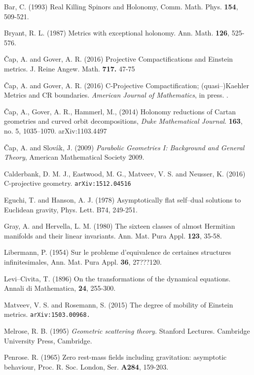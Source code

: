 \begin{thebibliography}{}
 Bar, C. (1993) 
Real Killing Spinors and Holonomy,
Comm. Math. Phys. {\bf 154}, 509-521.

 Bryant, R. L. (1987)
Metrics with exceptional holonomy. Ann. Math. {\bf 126}, 525-576.


 \v Cap, A. and Gover, A. R. (2016)
Projective Compactifications and Einstein metrics.
J. Reine Angew. Math. {\bf 717.}  47-75

 \v Cap, A. and Gover, A. R. (2016)
C-Projective Compactification; (quasi--)Kaehler Metrics and CR boundaries.
{\em  American Journal of Mathematics}, in press. .

 \v Cap, A., Gover, A. R., Hammerl, M., (2014) 
  Holonomy reductions of Cartan geometries and curved orbit
  decompositions, {\em Duke Mathematical Journal}. 
{\bf 163}, no. 5, 1035--1070.
 \quad arXiv:1103.4497

  
\v{C}ap, A. and Slov\'ak, J. (2009)
\emph{Parabolic Geometries I: Background and General Theory},
American Mathematical Society 2009.


 Calderbank,  D. M. J.,  Eastwood, M. G.,  Matveev, V. S. and 
Neusser, K.  (2016) C-projective geometry. {\tt arXiv:1512.04516}






Eguchi, T. and Hanson, A. J. (1978) Asymptotically flat self--dual solutions
to Euclidean gravity, Phys. Lett. B74, 249-251.

Gray, A. and Hervella, L. M. (1980) The sixteen classes of almost Hermitian manifolds and their linear
invariants. Ann. Mat. Pura Appl. {\bf 123}, 35-58.

Libermann, P. (1954) Sur le probleme d'equivalence de certaines structures infinitesimales, Ann.
Mat. Pura Appl. {\bf 36}, 27???120.


 Levi--Civita, T. (1896) On the transformations of the 
dynamical equations. Annali di Mathematica, {\bf 24}, 255-300.

 Matveev, V. S. and Rosemann, S. (2015)
The degree of mobility of Einstein metrics.
{\tt arXiv:1503.00968.}


Melrose, R. B. (1995)
{\em Geometric scattering theory.} Stanford Lectures. Cambridge University Press,
Cambridge.

Penrose. R. (1965) Zero rest-mass fields including gravitation: asymptotic behaviour, Proc. R. 
Soc. London, Ser. {\bf A284}, 159-203.


\end{thebibliography}
